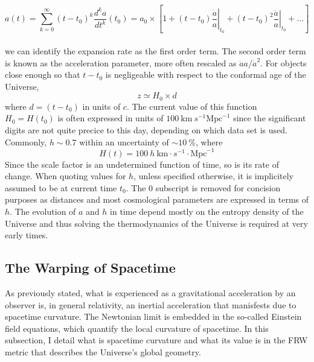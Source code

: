 \begin{equation}
\label{def:deva}
a(t) = \sum_{k=0}^{\infty} \left( t-t_0 \right)^k \frac{d^k a}{dt^k} (t_0)= a_0 \times \left[ 1 + (t-t_0) \left. \frac{\dot{a}}{a} \right\vert_{t_0} + (t-t_0)^2 \left. \frac{\ddot{a}}{a} \right\vert_{t_0} + \hdots \right]
\end{equation} \\ we can identify the expansion rate as the first order term. The second order term is known as the acceleration parameter, more often rescaled as $\ddot{a} a / \dot{a}^2$. For objects close enough so that $t-t_0$ is negligeable with respect to the conformal age of the Universe,
\begin{equation}
\label{eq:hubble_approx}
z \simeq H_0 \times d
\end{equation} where $d = (t-t_0)$ in units of $c$. The current value of this function $H_0 = H(t_0)$ is often expressed in units of $100~\mathrm{km}~s^{-1}\mathrm{Mpc}^{-1}$ since the significant digits are not quite precice to this day, depending on which data set is used. Commonly, $h \sim 0.7$ within an uncertainty of $\sim 10~\%$, where
\begin{equation}
\label{eq:h}
H(t) = 100~h~\mathrm{km}\cdot s^{-1} \cdot \mathrm{Mpc}^{-1}
\end{equation} Since the scale factor is an undetermined function of time, so is its rate of change. When quoting values for $h$, unless specified otherwise, it is implicitely assumed to be at current time $t_0$. The $0$ subscript is removed for concision purposes as distances and most cosmological parameters are expressed in terms of $h$. The evolution of $a$ and $h$ in time depend mostly on the entropy density of the Universe and thus solving the thermodynamics of the Universe is required at very early times.




\subsection{The Warping of Spacetime}

As previously stated, what is experienced as a gravitational acceleration by an observer is, in general relativity, an inertial acceleration that manisfests due to spacetime curvature. The Newtonian limit is embedded in the so-called Einstein field equations, which quantify the local curvature of spacetime. In this subsection, I detail what is spacetime curvature and what its value is in the FRW metric that describes the Universe's global geometry.  
 
